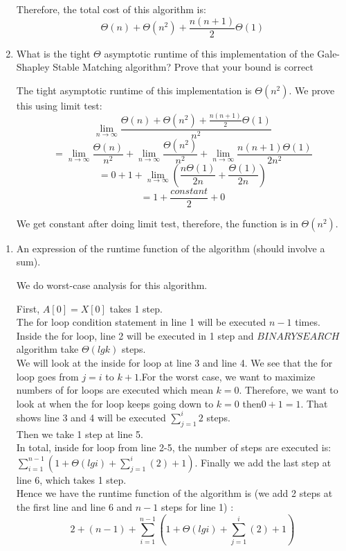 \documentclass{cpsc413Solutions}
\begin{document}
\begin{problemlist}
\begin{problem}
\begin{answer}
\begin{enumerate}
    Therefore, the total cost of this algorithm is: $$\Theta(n) + \Theta(n^2) + \frac{n(n+1)}{2}\Theta(1)$$
    
    \item What is the tight $\Theta$ asymptotic runtime of this implementation of the Gale-Shapley Stable Matching algorithm? Prove that your bound is correct
    
   The tight asymptotic runtime of this implementation is $\Theta(n^2)$.
   We prove this using limit test:
   $$\lim_{n\to\infty} \frac{\Theta(n) + \Theta(n^2)+ \frac{n(n+1)}{2}\Theta(1)}{n^2}$$
   $$= \lim_{n\to\infty} \frac{\Theta(n)}{n^2} + \lim_{n\to\infty} \frac{\Theta(n^2)}{n^2}+\lim_{n\to\infty} \frac{n(n+1)\Theta(1)}{2n^2}$$
    $$= 0 + 1 +\lim_{n\to\infty} (\frac{n\Theta(1)}{2n} + \frac{\Theta(1)}{2n}) $$
    $$=  1 + \frac{constant}{2} + 0$$
    
    We get constant after doing limit test, therefore, the function is in $\Theta(n^2)$.
    
\end{enumerate}
\end{answer}
\end{problem}

\begin{problem}
\begin{answer}
\begin{enumerate}
    \item  An expression of the runtime function of the algorithm (should involve a sum). 
    
    We do worst-case analysis for this algorithm. 
    
    First, $A[0] = X[0]$ takes 1 step.\\
    The for loop condition statement in line 1 will be executed $n-1$ times.\\
    Inside the for loop, line 2 will be executed in 1 step and $BINARYSEARCH$ algorithm take $\Theta(lgk)$ steps.\\
    We will look at the inside for loop at line 3 and line 4. We see that the for loop goes from $j=i$ to $k+1$.For the worst case, we want to maximize numbers of for loops are executed which mean $k=0$. Therefore, we want to look at when the for loop keeps going down to $k=0$ then$0+1=1$. That shows line 3 and 4 will be executed $\sum_{j=1}^i 2$ steps. \\
    Then we take 1 step at line 5.\\
    In total, inside for loop from line 2-5, the number of steps are executed is:
    $\sum_{i=1}^{n-1}(1+\Theta(lgi) + \sum_{j=1}^i(2)+1)$.
    Finally we add the last step at line 6, which takes 1 step.\\
    Hence we have the runtime function of the algorithm is (we add 2 steps at the first line and line 6 and $n-1$ steps for line 1) :
    \begin{equation}
       2 + (n-1) +  \sum_{i=1}^{n-1}(1+\Theta(lg i) + \sum_{j=1}^i(2)+1)
    \end{equation}
    

\end{enumerate}
\end{answer}
\end{problem}
\end{problemlist}
\end{document}
